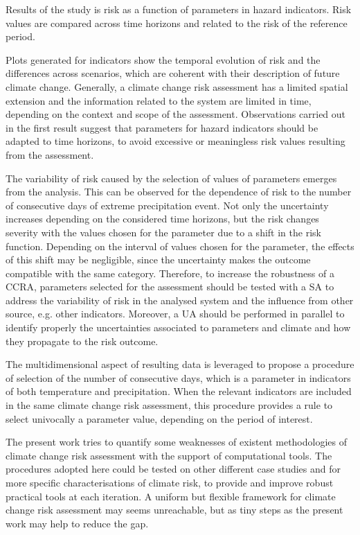 Results of the study is risk as a function of parameters in hazard indicators. Risk values are compared across time horizons and related to the risk of the reference period.

Plots generated for indicators show the temporal evolution of risk and the differences across scenarios, which are coherent with their description of future climate change. Generally, a climate change risk assessment has a limited spatial extension and the information related to the system are limited in time, depending on the context and scope of the assessment. Observations carried out in the first result suggest that parameters for hazard indicators should be adapted to time horizons, to avoid excessive or meaningless risk values resulting from the assessment.

The variability of risk caused by the selection of values of parameters emerges from the analysis. This can be observed for the dependence of risk to the number of consecutive days of extreme precipitation event. Not only the uncertainty increases depending on the considered time horizons, but the risk changes severity with the values chosen for the parameter due to a shift in the risk function. Depending on the interval of values chosen for the parameter, the effects of this shift may be negligible, since the uncertainty makes the outcome compatible with the same category. Therefore, to increase the robustness of a \gls{CCRA}, parameters selected for the assessment should be tested with a \gls{SA} to address the variability of risk in the analysed system and the influence from other source, e.g. other indicators. Moreover, a \gls{UA} should be performed in parallel to identify properly the uncertainties associated to parameters and climate and how they propagate to the risk outcome.

The multidimensional aspect of resulting data is leveraged to propose a procedure of selection of the number of consecutive days, which is a parameter in indicators of both temperature and precipitation. When the relevant indicators are included in the same climate change risk assessment, this procedure provides a rule to select univocally a parameter value, depending on the period of interest.

The present work tries to quantify some weaknesses of existent methodologies of climate change risk assessment with the support of computational tools. The procedures adopted here could be tested on other different case studies and for more specific characterisations of climate risk, to provide and improve robust practical tools at each iteration.
A uniform but flexible framework for climate change risk assessment may seems unreachable, but as tiny steps as the present work may help to reduce the gap.
